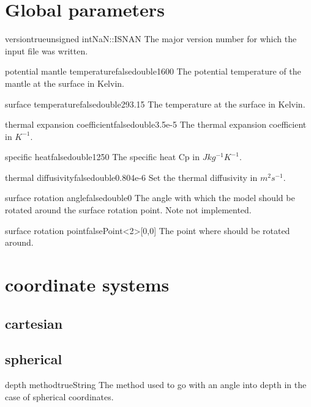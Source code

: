\documentclass{book}
\begin{document}
\section{Global parameters}
\begin{parameterbox}{version}{true}{unsigned int}{NaN::ISNAN}
The major version number for which the input file was written.
\end{parameterbox}
\begin{parameterbox}{potential mantle temperature}{false}{double}{1600}
The potential temperature of the mantle at the surface in Kelvin.
\end{parameterbox}
\begin{parameterbox}{surface temperature}{false}{double}{293.15}
The temperature at the surface in Kelvin.
\end{parameterbox}
\begin{parameterbox}{thermal expansion coefficient}{false}{double}{3.5e-5}
The thermal expansion coefficient in $K^{-1}$.
\end{parameterbox}
\begin{parameterbox}{specific heat}{false}{double}{1250}
The specific heat Cp in $J kg^{-1} K^{-1}$.
\end{parameterbox}
\begin{parameterbox}{thermal diffusivity}{false}{double}{0.804e-6}
Set the thermal diffusivity in $m^{2} s^{-1}$.
\end{parameterbox}
\begin{parameterbox}{surface rotation angle}{false}{double}{0}
The angle with which the model should be rotated around the surface rotation point. Note not implemented.
\end{parameterbox}
\begin{parameterbox}{surface rotation point}{false}{Point<2>}{[0,0]}
The point where should be rotated around.
\end{parameterbox}
\section{coordinate systems}
\subsection{cartesian}
\subsection{spherical}
\begin{parameterbox}{depth method}{true}{String}{}
The method used to go with an angle into depth in the case of spherical coordinates.
\end{parameterbox}
\end{document}

